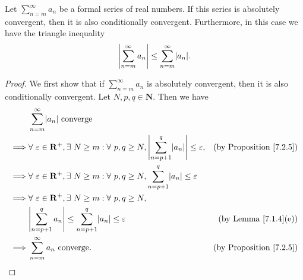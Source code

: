 \begin{proposition}\label{7.2.9}
    Let \(\sum_{n = m}^\infty a_n\) be a formal series of real numbers.
    If this series is absolutely convergent, then it is also conditionally convergent.
    Furthermore, in this case we have the triangle inequality
    \[
        \abs*{\sum_{n = m}^\infty a_n} \leq \sum_{n = m}^\infty \abs*{a_n}.
    \]
\end{proposition}

\begin{proof}
    We first show that if \(\sum_{n = m}^\infty a_n\) is absolutely convergent, then it is also conditionally convergent.
    Let \(N, p, q \in \mathbf{N}\).
    Then we have
    \begin{align*}
                 & \sum_{n = m}^\infty \abs*{a_n} \text{ converge}                                                                                                                               \\
        \implies & \forall\ \varepsilon \in \mathbf{R}^+, \exists\ N \geq m : \forall\ p, q \geq N, \abs*{\sum_{n = p + 1}^q \abs*{a_n}} \leq \varepsilon, & \text{(by Proposition \ref{7.2.5})} \\
        \implies & \forall\ \varepsilon \in \mathbf{R}^+, \exists\ N \geq m : \forall\ p, q \geq N, \sum_{n = p + 1}^q \abs*{a_n} \leq \varepsilon                                               \\
        \implies & \forall\ \varepsilon \in \mathbf{R}^+, \exists\ N \geq m : \forall\ p, q \geq N,                                                                                              \\
                 & \abs*{\sum_{n = p + 1}^q a_n} \leq \sum_{n = p + 1}^q \abs*{a_n} \leq \varepsilon                                                       & \text{(by Lemma \ref{7.1.4}(e))}    \\
        \implies & \sum_{n = m}^\infty a_n \text{ converge}.                                                                                               & \text{(by Proposition \ref{7.2.5})}
    \end{align*}


\end{proof}
